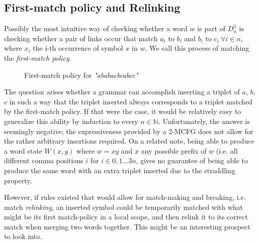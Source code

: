 \documentclass[nonatbib,numbers,10pt]{llncs}
\newcommand{\w}[1]{\textit{"#1"}}
\begin{document}
\subsection{First-match policy and Relinking}
Possibly the most intuitive way of checking whether a word $w$ is part of $D^3_n$ is checking whether a pair of links occur that match $a_i$ to $b_i$ and $b_i$ to $c_i \ \forall i \in n$, where $x_i$ the i-th occurrence of symbol $x$ in $w$. We call this process of matching the \textit{first-match policy}.

\begin{figure}[h!]
\centering
{}
\caption{First-match policy for \w{ababacbcabcc}}
\end{figure}

The question arises whether a grammar can accomplish inserting a triplet of $a$, $b$, $c$ in such a way that the triplet inserted always corresponds to a triplet matched by the first-match policy. If that were the case, it would be relatively easy to generalize this ability by induction to every $n \in \mathbb{N}$. Unfortunately, the answer is seemingly negative; the expressiveness provided by a 2-MCFG does not allow for the rather arbitrary insertions required. On a related note, being able to produce a word state $W(x,y)$ where $w=xy$ and $x$ any possible prefix of $w$ (i.e. all different comma positions $i$ for $i \in 0,1...3n$, gives no guarantee of being able to produce the same word with an extra triplet inserted due to the straddling property.

However, if rules existed that would allow for match-making and breaking, i.e. match \textit{relinking}, an inserted symbol could be temporarily matched with what might be its first match-policy in a local scope, and then relink it to its correct match when merging two words together. This might be an interesting prospect to look into.
\end{document}
